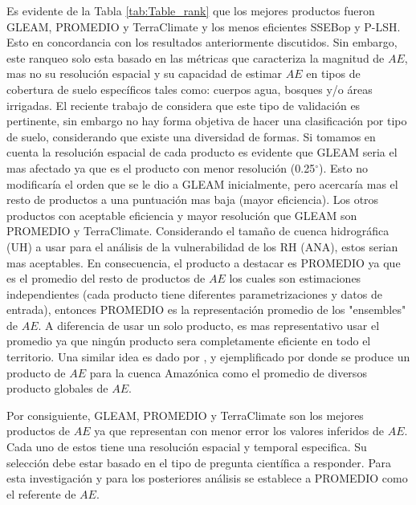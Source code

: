 \documentclass[12pt]{article}
\begin{document}
Es evidente de la Tabla \ref{tab:Table_rank} que los mejores productos fueron GLEAM, PROMEDIO y TerraClimate y los menos eficientes SSEBop y P-LSH. Esto en concordancia con los resultados anteriormente discutidos. Sin embargo, este ranqueo solo esta basado en las métricas que caracteriza la magnitud de $AE$, mas no su resolución espacial y su capacidad de estimar $AE$ en tipos de cobertura de suelo específicos tales como: cuerpos agua, bosques y/o áreas irrigadas. El reciente trabajo de \citet{Weerasinghe2019discuss} considera que este tipo de validación es pertinente, sin embargo no hay forma objetiva de hacer una clasificación por tipo de suelo, considerando que existe una diversidad de formas. Si tomamos en cuenta la resolución espacial de cada producto es evidente que GLEAM seria el mas afectado ya que es el producto con menor resolución (0.25$^{\circ}$). Esto no modificaría el orden que se le dio a GLEAM inicialmente, pero acercaría mas el resto de productos a una puntuación mas baja (mayor eficiencia). Los otros productos con aceptable eficiencia y mayor resolución que GLEAM son PROMEDIO y TerraClimate. Considerando el tamaño de cuenca hidrográfica (UH) a usar para el análisis de la vulnerabilidad de los RH (ANA), estos serian mas aceptables. En consecuencia, el producto a destacar es PROMEDIO ya que es el promedio del resto de productos de $AE$ los cuales son estimaciones independientes (cada producto tiene diferentes parametrizaciones y datos de entrada), entonces PROMEDIO es la representación promedio de los "ensembles" de $AE$. A diferencia de usar un solo producto, es mas representativo usar el promedio ya que ningún producto sera completamente eficiente en todo el territorio. Una similar idea es dado por \citet{zhang2016review}, y ejemplificado por \citet{da2019spatial} donde se produce un producto de $AE$ para la cuenca Amazónica como el promedio de diversos producto globales de $AE$.

Por consiguiente, GLEAM, PROMEDIO y TerraClimate son los mejores productos de $AE$ ya que representan con menor error los valores inferidos de $AE$. Cada uno de estos tiene una resolución espacial y temporal especifica. Su selección debe estar basado en el tipo de pregunta científica a responder. Para esta investigación y para los posteriores análisis se establece a PROMEDIO como el referente de $AE$.

\thispagestyle{empty}

\end{document}
